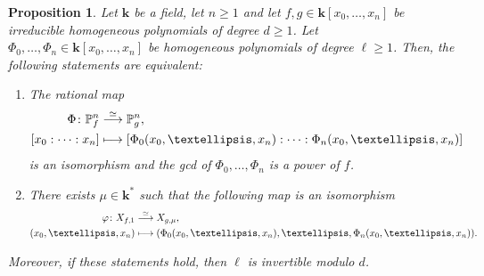 \documentclass[11pt]{article}
\newcommand\mto{\mathchoice{\longmapsto}{\mapsto}{\mapsto}{\mapsto}}
\newtheorem{proposition}[lemma]{Proposition}
\theoremstyle{definition}
\newcommand\iso{\stackrel{\simeq}{\longrightarrow}}
\renewcommand\k{{\mathbf k}}
\newcommand\p{{\mathbb P}}\let\PP\p
\newcommand{\kk}{\mathbf{k}}
\begin{document}
\begin{proposition}
\label{Prop.cyclic_covering}
Let $\kk$ be a field, let $n \geq 1$ and let $f,g\in \k[x_0,\ldots,x_n]$ be irreducible homogeneous polynomials
of degree $d \ge 1$. Let $\Phi_0,\ldots,\Phi_n\in \k[x_0,\ldots,x_n]$ be homogeneous polynomials of degree $\ell\ge 1$.
Then, the following statements are equivalent:
\begin{enumerate}
\item\label{cyclic_covering1} The rational map
\begin{align*}
\Phi\colon \p^n_f & \iso  \p^n_g, \\
{[x_0:\cdots:x_n]} & \mto  [\Phi_0(x_0,\ldots,x_n):\cdots: \Phi_n(x_0,\ldots,x_n)]
\end{align*}
is an isomorphism and the gcd of $\Phi_0, \ldots, \Phi_n$ is a power of $f$.
\item\label{cyclic_covering2}There exists $\mu\in \k^*$ such that the following map is an isomorphism
\begin{align*}
\varphi\colon X_{f,1} & \iso X_{g,\mu}, \\
(x_0,\ldots,x_n) & \mto (\Phi_0(x_0,\ldots,x_n),\ldots, \Phi_n(x_0,\ldots,x_n)).
\end{align*}
\end{enumerate}
Moreover, if these statements hold, then $\ell$ is invertible modulo $d$.
\end{proposition}
\end{document}
